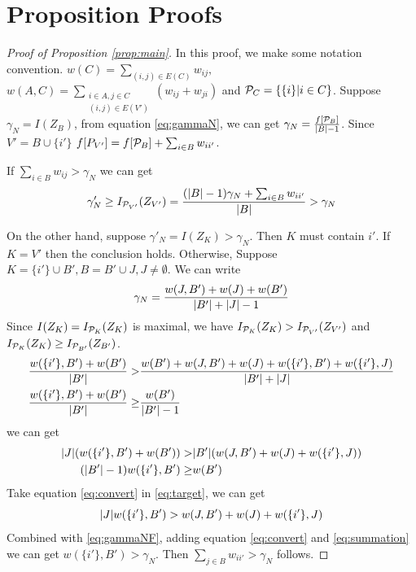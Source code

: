 \documentclass[runningheads]{llncs}
\begin{document}
\section{Proposition Proofs}
\begin{proof}[Proof of Proposition \ref{prop:main}]
		In this proof, we make some notation convention.
		$w(C) = \displaystyle\sum_{(i,j) \in E(C)} w_{ij},$
		$w(A, C) = \displaystyle\sum_{\substack{i \in A, j \in C \\ (i,j) \in E(V')}} (w_{ij}+w_{ji})$ and
		$\P_C = \{\{i \}| i \in C \}$. Suppose $\gamma_N = I(Z_B)$, from equation \eqref{eq:gammaN}, we can get $\gamma_N =\frac{f[\P_B]} {\abs{B} -1}$.
		Since $V' = B \cup \{i'\}$
		$f[P_{V'}] = f[\P_B] + \sum_{i \in B}w_{ii'}$.
		
		If $ \sum_{i \in B} w_{ij} > \gamma_N$ we can get
		$$
		\gamma'_N \geq I_{\P_{V'}}(Z_{V'}) = \frac{(\abs{B}-1)\gamma_N + \sum_{i \in B}w_{ii'}}{\abs{B}} > \gamma_N
		$$
		
		On the other hand, suppose $\gamma'_N = I(Z_K) > \gamma_N$. Then $K$ must contain $i'$. If $K=V'$ then the conclusion holds. Otherwise, Suppose $K = \{i'\} \cup B', B=B'\cup J, J\neq \emptyset$. We can write 
		\begin{equation}\label{eq:gammaNF}
		\gamma_N = \frac{w(J,B') + w(J) + w(B')}{ \abs{B'} + \abs{J} - 1 }
		\end{equation}
		Since $I(Z_K) = I_{\P_K}(Z_K)$ is maximal, we have $I_{\P_K}(Z_K) > I_{\P_{V'}}(Z_{V'})$ and $I_{\P_K}(Z_K) \geq I_{\P_{B'}}(Z_{B'})$.
		\begin{align*}
			\frac{w(\{i'\}, B') + w(B')}{\abs{B'}} >& \frac{w(B') + w(J, B') + w(J) + w(\{i'\}, B') + w(\{i'\}, J)}{\abs{B'} + \abs{J}}  \\
			\frac{w(\{i'\}, B') + w(B')}{\abs{B'}} \geq & \frac{w(B')}{\abs{B'} - 1}
		\end{align*}
		we can get 
		\begin{align}
			\abs{J} (w(\{i'\}, B') + w(B')) > & \abs{B'} (w(J, B') + w(J) + w(\{i'\}, J)) \label{eq:target}
			\\
			(\abs{B'} - 1)  w(\{i'\}, B') \geq & w(B') \label{eq:convert}
		\end{align}
		Take equation \eqref{eq:convert} in \eqref{eq:target}, we can get
		\begin{equation}\label{eq:summation}
		\abs{J} w(\{i'\}, B') > w(J, B') + w(J) + w(\{i'\}, J)
		\end{equation}	
		Combined with \eqref{eq:gammaNF}, adding equation \eqref{eq:convert} and \eqref{eq:summation} we can get
		$w(\{i'\}, B') > \gamma_N$. Then $\sum_{j \in B}w_{ii'} > \gamma_N $ follows.
\end{proof}	
\end{document}
